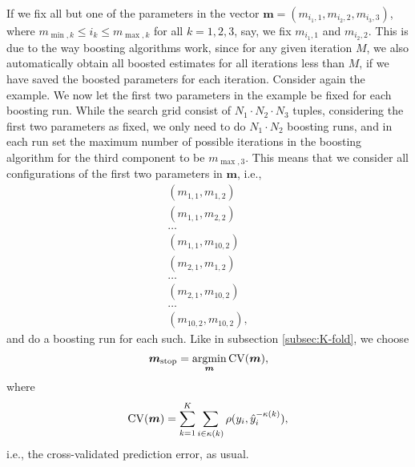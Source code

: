 If we fix all but one of the parameters in the vector $\boldsymbol{m}=\left(m_{i_1,1},m_{i_2,2},m_{i_3,3}\right)$, where $m_{\min,k}\leq i_k\leq m_{\max,k}$ for all $k=1,2,3$, say, we fix $m_{i_1,1}$ and $m_{i_2,2}$.
This is due to the way boosting algorithms work, since for any given iteration $M$, we also automatically obtain all boosted estimates for all iterations less than $M$, if we have saved the boosted parameters for each iteration.
Consider again the example.
We now let the first two parameters in the example be fixed for each boosting run.
While the search grid consist of $N_1\cdot N_2\cdot N_3$ tuples, considering the first two parameters as fixed, we only need to do $N_1\cdot N_2$ boosting runs, and in each run set the maximum number of possible iterations in the boosting algorithm for the third component to be $m_{\max,3}$.
This means that we consider all configurations of the first two parameters in $\boldsymbol{m}$, i.e.,
\begin{align*}
    \left(m_{1,1},m_{1,2}\right) \\
    \left(m_{1,1},m_{2,2}\right) \\
    \ldots \\
    \left(m_{1,1},m_{10,2}\right) \\
    \left(m_{2,1},m_{1,2}\right) \\
    \ldots \\
    \left(m_{2,1},m_{10,2}\right) \\
    \ldots \\
    \left(m_{10,2},m_{10,2}\right),
\end{align*}
and do a boosting run for each such.
Like in subsection \ref{subsec:K-fold}, we choose
\begin{equation*}
    \boldsymbol{m}_{\text{stop}}=\operatorname*{argmin}_{\boldsymbol{m}}\operatorname{CV}(\boldsymbol{m}),
\end{equation*}
where
\begin{equation*}
    \operatorname{CV}(\boldsymbol{m})=\sum_{k=1}^K\sum_{i\in\kappa(k)}\rho(y_i,\hat{y}_i^{-\kappa(k)}),
\end{equation*}
i.e., the cross-validated prediction error, as usual.
